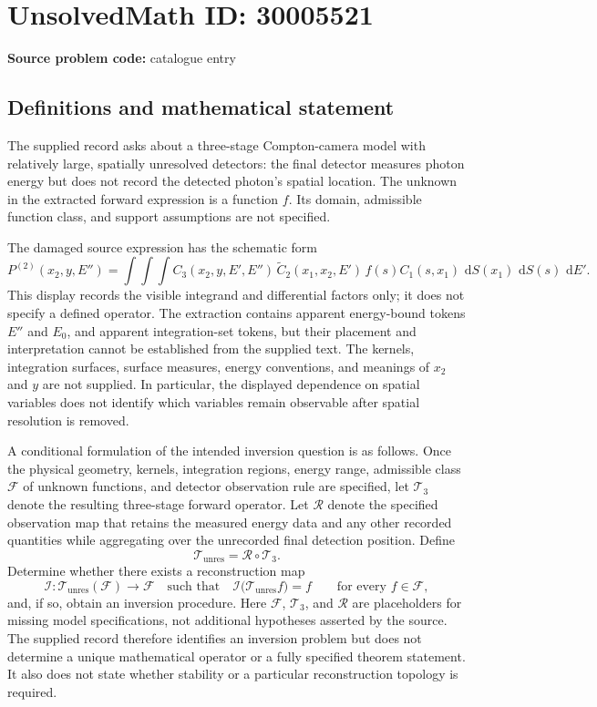 \documentclass[11pt]{article}
\newcommand{\dd}{\,\mathrm{d}}
\begin{document}
\section*{UnsolvedMath ID: 30005521}
\textbf{Source problem code:} catalogue entry
\subsection{Definitions and mathematical statement}
The supplied record asks about a three-stage Compton-camera model with relatively large, spatially unresolved detectors: the final detector measures photon energy but does not record the detected photon's spatial location. The unknown in the extracted forward expression is a function \(f\). Its domain, admissible function class, and support assumptions are not specified.

The damaged source expression has the schematic form
\[
P^{(2)}(x_2,y,E'')
=\int\!\int\!\int
C_3(x_2,y,E',E'')\,
\widetilde C_2(x_1,x_2,E')\,
f(s)C_1(s,x_1)\,
\dd S(x_1)\,\dd S(s)\,\dd E'.
\]
This display records the visible integrand and differential factors only; it does not specify a defined operator. The extraction contains apparent energy-bound tokens \(E''\) and \(E_0\), and apparent integration-set tokens, but their placement and interpretation cannot be established from the supplied text. The kernels, integration surfaces, surface measures, energy conventions, and meanings of \(x_2\) and \(y\) are not supplied. In particular, the displayed dependence on spatial variables does not identify which variables remain observable after spatial resolution is removed.

A conditional formulation of the intended inversion question is as follows. Once the physical geometry, kernels, integration regions, energy range, admissible class \(\mathcal F\) of unknown functions, and detector observation rule are specified, let \(\mathcal T_3\) denote the resulting three-stage forward operator. Let \(\mathcal R\) denote the specified observation map that retains the measured energy data and any other recorded quantities while aggregating over the unrecorded final detection position. Define
\[
\mathcal T_{\mathrm{unres}}=\mathcal R\circ\mathcal T_3.
\]
Determine whether there exists a reconstruction map
\[
\mathcal I:\mathcal T_{\mathrm{unres}}(\mathcal F)\longrightarrow\mathcal F
\quad\text{such that}\quad
\mathcal I\bigl(\mathcal T_{\mathrm{unres}}f\bigr)=f
\qquad\text{for every }f\in\mathcal F,
\]
and, if so, obtain an inversion procedure. Here \(\mathcal F\), \(\mathcal T_3\), and \(\mathcal R\) are placeholders for missing model specifications, not additional hypotheses asserted by the source. The supplied record therefore identifies an inversion problem but does not determine a unique mathematical operator or a fully specified theorem statement. It also does not state whether stability or a particular reconstruction topology is required.
\end{document}

